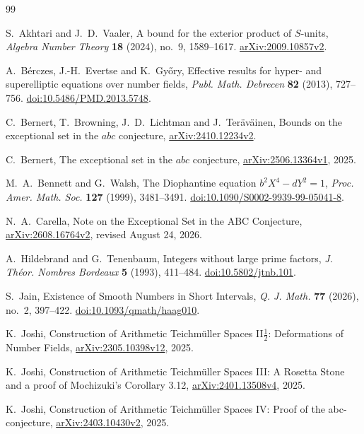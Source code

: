 \documentclass[11pt]{amsart}
\theoremstyle{definition}
\theoremstyle{remark}
\begin{document}
\begin{thebibliography}{99}
\raggedright

S.~Akhtari and J.~D.~Vaaler, A bound for the exterior product of $S$-units,
\emph{Algebra Number Theory} \textbf{18} (2024), no.~9, 1589--1617.
\href{https://arxiv.org/abs/2009.10857v2}{arXiv:2009.10857v2}.

A.~B\'erczes, J.-H.~Evertse and K.~Gy\H{o}ry,
Effective results for hyper- and superelliptic equations over number fields,
\emph{Publ. Math. Debrecen} \textbf{82} (2013), 727--756.
\href{https://doi.org/10.5486/PMD.2013.5748}{doi:10.5486/PMD.2013.5748}.

C.~Bernert, T.~Browning, J.~D.~Lichtman and J.~Ter\"av\"ainen,
Bounds on the exceptional set in the $abc$ conjecture,
\href{https://arxiv.org/abs/2410.12234v2}{arXiv:2410.12234v2}.

C.~Bernert, The exceptional set in the $abc$ conjecture,
\href{https://arxiv.org/abs/2506.13364v1}{arXiv:2506.13364v1}, 2025.

M.~A.~Bennett and G.~Walsh, The Diophantine equation $b^2X^4-dY^2=1$,
\emph{Proc. Amer. Math. Soc.} \textbf{127} (1999), 3481--3491.
\href{https://doi.org/10.1090/S0002-9939-99-05041-8}{doi:10.1090/S0002-9939-99-05041-8}.

N.~A.~Carella, Note on the Exceptional Set in the ABC Conjecture,
\href{https://arxiv.org/abs/2608.16764v2}{arXiv:2608.16764v2},
revised August 24, 2026.

A.~Hildebrand and G.~Tenenbaum, Integers without large prime factors,
\emph{J. Th\'eor. Nombres Bordeaux} \textbf{5} (1993), 411--484.
\href{https://doi.org/10.5802/jtnb.101}{doi:10.5802/jtnb.101}.

S.~Jain, Existence of Smooth Numbers in Short Intervals,
\emph{Q. J. Math.} \textbf{77} (2026), no.~2, 397--422.
\href{https://doi.org/10.1093/qmath/haag010}{doi:10.1093/qmath/haag010}.

K.~Joshi, Construction of Arithmetic Teichm\"uller Spaces II$\frac12$:
Deformations of Number Fields,
\href{https://arxiv.org/abs/2305.10398v12}{arXiv:2305.10398v12}, 2025.

K.~Joshi, Construction of Arithmetic Teichm\"uller Spaces III:
A Rosetta Stone and a proof of Mochizuki's Corollary 3.12,
\href{https://arxiv.org/abs/2401.13508v4}{arXiv:2401.13508v4}, 2025.

K.~Joshi, Construction of Arithmetic Teichm\"uller Spaces IV:
Proof of the abc-conjecture,
\href{https://arxiv.org/abs/2403.10430v2}{arXiv:2403.10430v2}, 2025.


\end{thebibliography}
\end{document}
